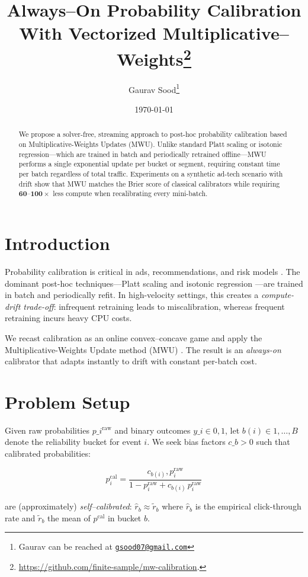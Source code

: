 \documentclass[12pt, letterpaper]{article}
\title{Always--On Probability Calibration With Vectorized Multiplicative--Weights\thanks{\href{https://github.com/finite-sample/mw-calibration}{https://github.com/finite-sample/mw-calibration}.}}
\author{Gaurav Sood\thanks{Gaurav can be reached at \href{mailto:gsood07@gmail.com}{\footnotesize{\texttt{gsood07@gmail.com}}}}\vspace{.5cm}}
\date{\today}
\begin{document}
\maketitle

\begin{abstract}
We propose a solver-free, streaming approach to post-hoc probability calibration based on Multiplicative-Weights Updates (MWU).  Unlike standard Platt scaling or isotonic regression---which are trained in batch and periodically retrained offline---MWU performs a single exponential update per bucket or segment, requiring constant time per batch regardless of total traffic. Experiments on a synthetic ad-tech scenario with drift show that MWU matches the Brier score of classical calibrators while requiring $\mathbf{60\text{--}100\times}$ less compute when recalibrating every mini-batch.
\end{abstract}

\section{Introduction}
Probability calibration is critical in ads, recommendations, and risk models \citep{Niculescu05, Guo17}.  The dominant post-hoc techniques---Platt scaling \citep{Platt99} and isotonic regression \citep{Zadrozny02}---are trained in batch and periodically refit. In high-velocity settings, this creates a \emph{compute-drift trade-off}: infrequent retraining leads to miscalibration, whereas frequent retraining incurs heavy CPU costs.

We recast calibration as an online convex–concave game and apply the Multiplicative-Weights Update method (MWU) \citep{Arora12}. The result is an \emph{always-on} calibrator that adapts instantly to drift with constant per-batch cost.

\section{Problem Setup}
Given raw probabilities $p\_i^{\mathrm{raw}}$ and binary outcomes $y\_i\in{0,1}$,
let $b(i)\in{1,\dots,B}$ denote the reliability bucket for event $i$. We seek bias factors $c\_b>0$ such that calibrated probabilities:

$$p_i^{\mathrm{cal}} = \frac{c_{b(i)},p_i^{\mathrm{raw}}}
                              {1-p_i^{\mathrm{raw}}+c_{b(i)}\,p_i^{\mathrm{raw}}}
$$

are
(approximately) \emph{self--calibrated}:
$\hat{r}_b \approx \tilde{r}_b$ where $\hat{r}_b$ is the empirical click-through rate and $\tilde{r}_b$ the mean of $p^{\mathrm{cal}}$ in bucket $b$.
\end{document}

